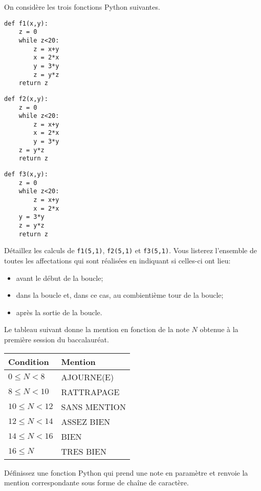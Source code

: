 \begin{exercise}
	On considère les trois fonctions Python suivantes.
	\begin{center}
		\begin{varwidth}[t]{.5\textwidth}
			\begin{lstlisting}[language=iPython,linewidth = 4cm]
def f1(x,y):
    z = 0
    while z<20:
        z = x+y
        x = 2*x
        y = 3*y
        z = y*z
    return z
\end{lstlisting}	
		\end{varwidth}\hspace{1cm}
		\begin{varwidth}[t]{.5\textwidth}
			\begin{lstlisting}[language=iPython,linewidth = 4cm]
def f2(x,y):
    z = 0
    while z<20:
        z = x+y
        x = 2*x
        y = 3*y
    z = y*z
    return z
\end{lstlisting}	
		\end{varwidth}\hspace{1cm}
		\begin{varwidth}[t]{.5\textwidth}
			\begin{lstlisting}[language=iPython,linewidth = 4cm]
def f3(x,y):
    z = 0
    while z<20:
        z = x+y
        x = 2*x
    y = 3*y
    z = y*z
    return z
\end{lstlisting}	
		\end{varwidth}
	\end{center}
Détaillez les calculs de \texttt{f1(5,1)}, \texttt{f2(5,1)} et \texttt{f3(5,1)}. Vous listerez l'ensemble de toutes les affectations qui sont réalisées en indiquant si celles-ci ont lieu:\begin{itemize}
	\item avant le début de la boucle;
	\item dans la boucle et, dans ce cas, au combientième tour de la boucle;
	\item après la sortie de la boucle.
\end{itemize}
\end{exercise}



\begin{exercise}
	Le tableau suivant donne la mention en fonction de la note $N$ obtenue à la première session du baccalauréat.
	\begin{center}
		\begin{tabular}{|l|l|}
			\hline
			Condition & Mention\\\hline
			$0\leq N<8$& AJOURNE(E)\\\hline
			$8\leq N<10$&RATTRAPAGE\\\hline
			$10\leq N<12$&SANS MENTION\\\hline
			$12\leq N<14$&ASSEZ BIEN\\\hline
			$14\leq N<16$&BIEN\\\hline
			$16\leq N$&TRES BIEN\\\hline
		\end{tabular}
	\end{center}
	Définissez une fonction Python qui prend une note en paramètre et renvoie la mention correspondante sous forme de chaîne de caractère.
\end{exercise}


